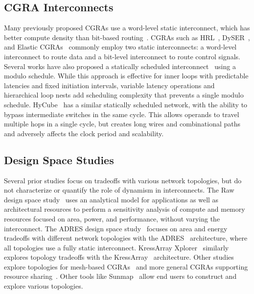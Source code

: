 \subsection{CGRA Interconnects}
Many previously proposed CGRAs use a word-level static interconnect, which has better compute density than bit-based routing~\cite{bus-fpga}. CGRAs such as HRL~\cite{hrl}, DySER~\cite{dyser}, and Elastic CGRAs~\cite{elasticCGRAs} commonly employ two static interconnects: a word-level interconnect to route data and a bit-level interconnect to route control signals.
Several works have also proposed a statically scheduled interconnect~\cite{van2009static, dimitroulakos2006exploring, wave} using a modulo schedule. While this approach is effective for inner loops with predictable latencies and fixed initiation intervals, variable latency operations and hierarchical loop nests add scheduling complexity that prevents a single modulo schedule. HyCube~\cite{hycube} has a similar statically scheduled network, with the ability to bypass intermediate switches in the same cycle. This allows operands to travel multiple hops in a single cycle, but creates long wires and combinational paths and adversely affects the clock period and scalability.
\subsection{Design Space Studies} Several prior studies focus on tradeoffs with various network topologies, but do not characterize or quantify the role of dynamism in interconnects.
The Raw design space study~\cite{dse-raw} uses an analytical model for applications as well as architectural resources to perform a sensitivity analysis of compute and memory resources focused on area, power, and performance, without varying the interconnect. The ADRES design space study~\cite{dse-adres} focuses on area and energy tradeoffs with different network topologies with the ADRES~\cite{adres} architecture, where all topologies use a fully static interconnect. KressArray Xplorer~\cite{dse-kressarray} similarly explores topology tradeoffs with the KressArray~\cite{kress} architecture. Other studies explore topologies for mesh-based CGRAs~\cite{dse-date} and more general CGRAs supporting resource sharing~\cite{dse-tvlsi}. Other tools like Sunmap~\cite{sunmap} allow end users to construct and explore various topologies.

